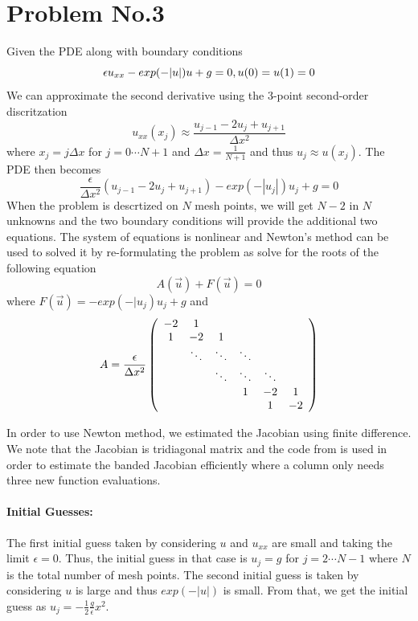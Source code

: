 \section*{Problem No.3} \label{sec:prob3}
Given the PDE along with boundary conditions 
\[
\epsilon u_{xx}-exp(-|u|)u+g =0,\\
u(0)=u(1)=0
\]
We can approximate the second derivative using the 3-point second-order discritzation 
\[
u_{xx}(x_{j}) \approx \frac{u_{j-1}-2u_{j}+u_{j+1}}{\Delta x^{2}}
\]
where $x_{j}=j\Delta x$ for $j=0 \cdots N+1$ and $\Delta x = \frac{1}{N+1}$ and thus $u_{j}\approx u(x_{j})$. The PDE then becomes 
\[
\frac{\epsilon}{\Delta x^{2}} \left(u_{j-1}-2u_{j}+u_{j+1}\right) - exp(-|u_{j}|)u_{j}+g=0
\]
When the problem is descrtized on $N$ mesh points, we will get $N-2$ in $N$  unknowns and the two boundary conditions will provide the additional two equations. The system of equations is nonlinear and Newton's method can be used to solved it by re-formulating the problem as solve for the roots of the following equation
\[
A(\overrightarrow{u}) + F(\overrightarrow{u})=0
\]
where $F(\overrightarrow{u}) = -exp(-|u_{j})u_{j}+g$ and 
\[
A = \frac{\epsilon}{\Delta x^{2}}
\left( 
\begin{array}{cc cc cc}
-2 & 1 &    &   &   & \\
1 & -2 & 1  &   &   & \\
  & \ddots & \ddots   & \ddots    &   & \\
  & & \ddots & \ddots   & \ddots   & \\
  &   &   & 1  & -2 &1 \\
  &   &   &    & 1 &-2 \\
\end{array} 
\right)
\]

In order to use Newton method, we estimated the Jacobian using finite difference. We note that the Jacobian is tridiagonal matrix and the code from \cite{doi:10.1137/1.9780898718898} is used in order to estimate the banded Jacobian efficiently where a column only needs three new function evaluations. 
\paragraph{Initial Guesses:} The first initial guess taken by considering $u$ and $u_{xx}$ are small and taking the limit $\epsilon =0$. Thus, the initial guess in that case is $u_{j}=g$ for $ j=2 \cdots N-1$ where $N$ is the total number of mesh points. The second initial guess is taken by considering $u$ is large and thus $exp(-|u|)$ is small. From that, we get the initial guess as $u_{j}=-\frac{1}{2}\frac{g}{\epsilon}x^{2}$.

